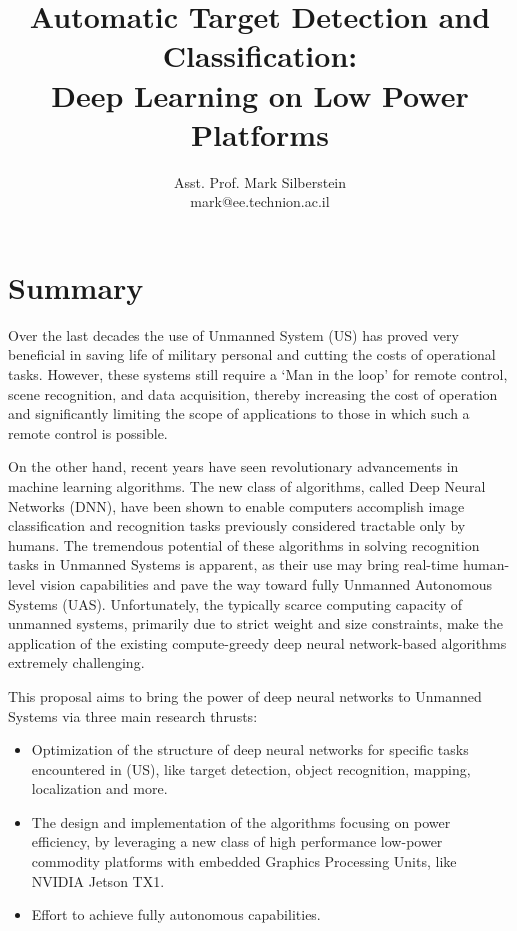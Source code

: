 \documentclass{article} %
\title{Automatic Target Detection and Classification: \\
  Deep Learning on Low Power Platforms}
\author{
  Asst. Prof. Mark Silberstein \\
  mark@ee.technion.ac.il\\
}
\begin{document}
\maketitle

\section{Summary}

Over the last decades the use of Unmanned System (US) has proved very beneficial
in saving life of military personal and cutting the costs of operational tasks.
However, these systems still require a `Man in the loop' for remote control,
scene recognition, and data acquisition, thereby increasing the cost of
operation and significantly limiting the scope of applications to those in which
such a remote control is possible.

On the other hand, recent years have seen revolutionary advancements in machine
learning algorithms. The new class of algorithms, called Deep Neural Networks
(DNN), have been shown to enable computers accomplish image classification and
recognition tasks previously considered tractable only by humans. The tremendous
potential of these algorithms in solving recognition tasks in Unmanned Systems
is apparent, as their use may bring real-time human-level vision capabilities
and pave the way toward fully Unmanned Autonomous Systems (UAS). Unfortunately,
the typically scarce computing capacity of unmanned systems, primarily due to
strict weight and size constraints, make the application of the existing
compute-greedy deep neural network-based algorithms extremely challenging.

This proposal aims to bring the power of deep neural networks to Unmanned
Systems via three main research thrusts:

\begin{itemize}
\item Optimization of the structure of deep neural networks for specific
	tasks encountered in (US), like target detection, object recognition, 
	mapping, localization and more.
\item The design and implementation of the algorithms focusing on power
	efficiency, by leveraging a new  class of high
	performance low-power commodity platforms with embedded Graphics
	Processing Units, like  NVIDIA Jetson TX1.
\item Effort to achieve fully autonomous capabilities.
\end{itemize}
\end{document}
